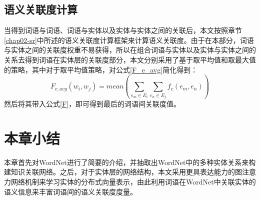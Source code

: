 \subsection{语义关联度计算}
当得到词语与词语、词语与实体以及实体与实体之间的关联后，本文按照章节\ref{chap02-sr}中所述的语义关联度计算框架来计算语义关联度。由于在本部分，词语与实体之间的关联度权重不易获得，所以在组合词语与实体以及实体与实体之间的关系去得到词语在实体层的关联度部分，本文分别采用了基于取平均值和取最大值的策略，其中对于取平均值策略，对公式\ref{F_e_avg}简化得到：
\begin{equation}
    F_{e;avg}(w_i, w_j) = mean(\sum_{e_m \in E_i}^{ }\sum_{e_n \in E_j}^{ }f_e(e_m, e_n))
    \label{F_e_avg_simple}
\end{equation}
\noindent 然后将其带入公式\ref{F}，即可得到最后的词语间关联度值。


\section{本章小结}
本章首先对WordNet进行了简要的介绍，并抽取出WordNet中的多种实体关系来构建知识关联网络。之后，对于实体层的网络结构，本文采用更具表达能力的图注意力网络机制来学习实体的分布式向量表示，由此利用词语在WordNet中关联实体的语义信息来丰富词语间的语义关联度度量。